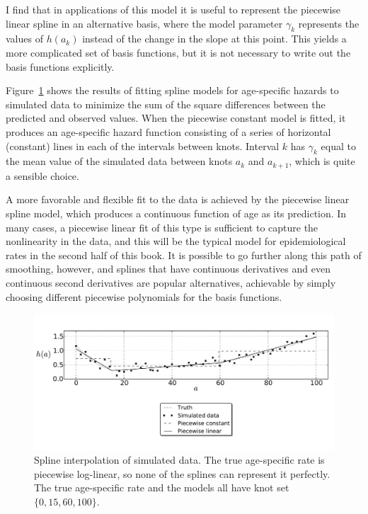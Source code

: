 I find that in applications of this model it is useful to represent
the piecewise linear spline in an alternative basis, where the model
parameter $\gamma_k$ represents the values of $h(a_k)$ instead of the
change in the slope at this point.  This yields a more complicated set
of basis functions, but it is not necessary to write out the basis
functions explicitly.


Figure~\ref{splines_fig} shows the results of fitting spline models
for age-specific hazards to simulated data to minimize the sum of the
square differences between the predicted and observed values.  When
the piecewise constant model is fitted, it produces an age-specific
hazard function consisting of a series of horizontal (constant) lines
in each of the intervals between knots.  Interval $k$ has
$\gamma_k$ equal to the mean value of the simulated data between knots
$a_k$ and $a_{k+1}$, which is quite a sensible choice.

A more favorable and flexible fit to the data is achieved by the
piecewise linear spline model, which produces a continuous function
of age as its prediction. In many cases, a piecewise linear fit of
this type is sufficient to capture the nonlinearity in the data, and
this will be the typical model for epidemiological rates in the second
half of this book.  It is possible to go further along this path of
smoothing, however, and splines that have continuous derivatives and
even continuous second derivatives are popular alternatives, achievable
by simply choosing different piecewise polynomials for the basis
functions.


\begin{figure}[h]
\begin{center}
\includegraphics[width=\textwidth]{splines-fig.pdf}
\caption[Spline interpolation of simulated data.]{Spline interpolation
  of simulated data. The true age-specific
  rate is piecewise log-linear, so none of the splines can represent
  it perfectly. The true age-specific rate and the models all have
  knot set $\{0, 15, 60, 100\}$.}
\label{splines_fig}
\end{center}
\end{figure}


